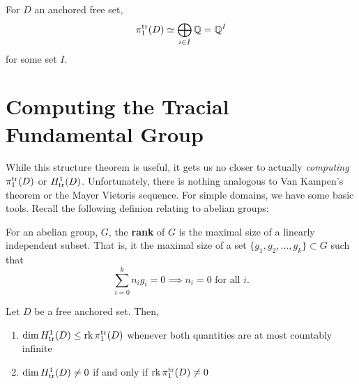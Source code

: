 \begin{theorem}
  For \(D\) an anchored free set,
  \[
    \pi_1^{\operatorname{tr}}(D) \simeq \bigoplus_{i \in I} \mathbb{Q} = \mathbb{Q} ^I
  \]
  for some set \(I\).
\end{theorem}

\section{Computing the Tracial Fundamental Group}%
\label{sec:interplay}

While this structure theorem is useful, it gets us no closer to actually
\emph{computing} \(\pi_1^{\operatorname{tr}}(D)\) or \(H^1_{\operatorname{tr}}(D)\). Unfortunately, there
is nothing analogous to Van Kampen's theorem or the Mayer Vietoris sequence. For
simple domains, we have some basic tools. Recall the following definion relating
to abelian groups:

\begin{definition}[Rank]%
\label{def:rank}
  For an abelian group, \(G\), the \textbf{rank} of \(G\) is the maximal size of
  a linearly independent subset. That is, it the maximal size of a set
  \(\{g_1, g_2, \dots ,g_k\} \subset G\) such that
  \[
    \sum_{i=0}^k n_ig_i =0 \implies n_i=0 \textrm{ for all }i.
  \]
\end{definition}

\begin{theorem}
  Let \(D\) be a free anchored set. Then,

\begin{enumerate}
  \item \(\dim H_{\operatorname{tr}}^1(D) \leq \operatorname{rk} \pi_1^{\operatorname{tr}}(D)\) whenever both
      quantities are at most countably infinite
  \item \(\dim H_{\operatorname{tr}}^1(D)\neq 0\) if and only if \(\operatorname{rk} \pi_1^{\operatorname{tr}}(D)\neq 0\)
\end{enumerate}
\end{theorem}

